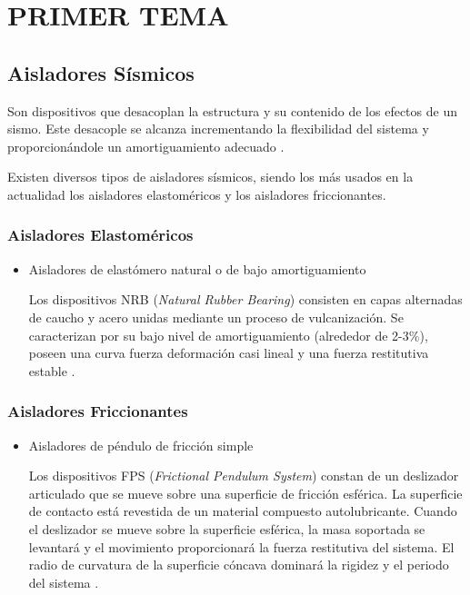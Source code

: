 \section{PRIMER TEMA}
	\subsection{Aisladores Sísmicos}
Son dispositivos que desacoplan la estructura y su contenido de los efectos de un sismo. Este desacople se alcanza incrementando la flexibilidad del sistema y proporcionándole un amortiguamiento adecuado \citep{Skinner1993}.

Existen diversos tipos de aisladores sísmicos, siendo los más usados en la actualidad los aisladores elastoméricos y los aisladores friccionantes.

		\subsubsection{Aisladores Elastoméricos}
\begin{itemize}

\item Aisladores de elastómero natural o de bajo amortiguamiento

Los dispositivos NRB (\textit{Natural Rubber Bearing}) consisten en capas alternadas de caucho y acero unidas mediante un proceso de vulcanización. Se caracterizan por su bajo nivel de amortiguamiento (alrededor de 2-3\%), poseen una curva fuerza deformación casi lineal y una fuerza restitutiva estable \citep{Kelly1999}.

\end{itemize}

		\subsubsection{Aisladores Friccionantes}
\begin{itemize}

\item Aisladores de péndulo de fricción simple

Los dispositivos FPS (\textit{Frictional Pendulum System}) constan de un deslizador articulado que se mueve sobre una superficie de fricción esférica. La superficie de contacto está revestida de un material compuesto autolubricante. Cuando el deslizador se mueve sobre la superficie esférica, la masa soportada se levantará y el movimiento proporcionará la fuerza restitutiva del sistema. El radio de curvatura de la superficie cóncava dominará la rigidez y el periodo del sistema \citep{Wu2001}.

\end{itemize}


